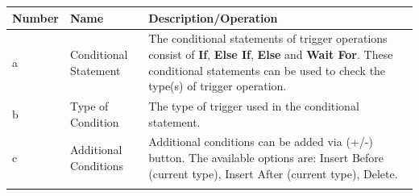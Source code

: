 \begin{enumerate}
  \begin{longtable}[]{@{}lll@{}}
  \toprule
  \begin{minipage}[b]{0.04\columnwidth}\raggedright
  Number\strut
  \end{minipage} & \begin{minipage}[b]{0.23\columnwidth}\raggedright
  Name\strut
  \end{minipage} & \begin{minipage}[b]{0.65\columnwidth}\raggedright
  Description/Operation\strut
  \end{minipage}\tabularnewline
  \midrule
  \endhead
  \begin{minipage}[t]{0.04\columnwidth}\raggedright
  a\strut
  \end{minipage} & \begin{minipage}[t]{0.23\columnwidth}\raggedright
  Conditional Statement\strut
  \end{minipage} & \begin{minipage}[t]{0.65\columnwidth}\raggedright
  The conditional statements of trigger operations consist of
  \textbf{If}, \textbf{Else If}, \textbf{Else} and \textbf{Wait For}.
  These conditional statements can be used to check the type(s) of
  trigger operation.\strut
  \end{minipage}\tabularnewline
  \begin{minipage}[t]{0.04\columnwidth}\raggedright
  b\strut
  \end{minipage} & \begin{minipage}[t]{0.23\columnwidth}\raggedright
  Type of Condition\strut
  \end{minipage} & \begin{minipage}[t]{0.65\columnwidth}\raggedright
  The type of trigger used in the conditional statement.\strut
  \end{minipage}\tabularnewline
  \begin{minipage}[t]{0.04\columnwidth}\raggedright
  c\strut
  \end{minipage} & \begin{minipage}[t]{0.23\columnwidth}\raggedright
  Additional Conditions\strut
  \end{minipage} & \begin{minipage}[t]{0.65\columnwidth}\raggedright
  Additional conditions can be added via (+/-) button. The available
  options are: Insert Before (current type), Insert After (current
  type), Delete.\strut
  \end{minipage}\tabularnewline
  \begin{minipage}[t]{0.04\columnwidth}\raggedright

\end{minipage}
\end{longtable}
\end{enumerate}
